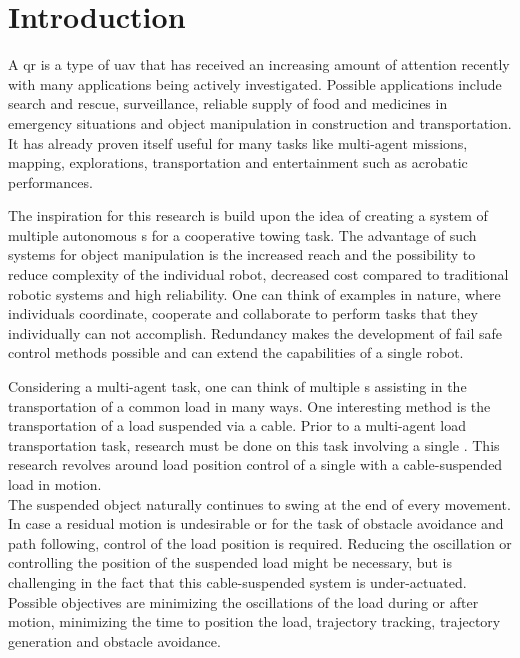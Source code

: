 \chapter{Introduction} \label{ch:intro}
A \acf{qr} is a type of \acf*{uav} that has received an increasing amount of attention recently with many applications being actively investigated. Possible applications include search and rescue, surveillance, reliable supply of food and medicines in emergency situations and object manipulation in construction and transportation. It has already proven itself useful for many tasks like multi-agent missions, mapping, explorations, transportation and entertainment such as acrobatic performances.

The inspiration for this research is build upon the idea of creating a system of multiple autonomous s for a cooperative towing task. The advantage of such systems for object manipulation is the increased reach and the possibility to reduce complexity of the individual robot, decreased cost compared to traditional robotic systems and high reliability. One can think of examples in nature, where individuals coordinate, cooperate and collaborate to perform tasks that they individually can not accomplish. Redundancy makes the development of fail safe control methods possible and can extend the capabilities of a single robot. 						

Considering a multi-agent task, one can think of multiple s assisting in the transportation of a common load in many ways.
One interesting method is the transportation of a load suspended via a cable.
Prior to a multi-agent load transportation task, research must be done on this task involving a single .
This research revolves around load position control of a single  with a cable-suspended load in motion.\\ 
The suspended object naturally continues to swing at the end of every movement. In case a residual motion is undesirable or for the task of obstacle avoidance and path following, control of the load position is required. Reducing the oscillation or controlling the position of the suspended load might be necessary, but is challenging in the fact that this cable-suspended system is under-actuated. Possible objectives are minimizing the oscillations of the load during or after motion, minimizing the time to position the load, trajectory tracking, trajectory generation and obstacle avoidance.

